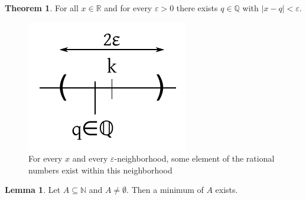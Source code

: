 \documentclass[a4paper,landscape,twocolumn]{article}
\theoremstyle{definition}
\newtheorem{theorem}{Theorem}
\newtheorem{lemma}{Lemma}
\newcommand\abs[1]{\left|#1\right|}
\begin{document}
\begin{theorem}
  \label{QisdenseinR}
  For all $x \in \mathbb R$ and for every $\varepsilon > 0$ there exists $q \in \mathbb Q$
  with $\abs{x - q} < \varepsilon$.

  \begin{figure}[!h]
    \begin{center}
      \includegraphics{img/dense_q.pdf}
      \caption{For every $x$ and every $\varepsilon$-neighborhood, some element of the rational numbers exist within this neighborhood}
    \end{center}
  \end{figure}
\end{theorem}
\begin{lemma}
  Let $A \subseteq \mathbb N$ and $A \neq \emptyset$.
  Then a minimum of $A$ exists.
\end{lemma}
\end{document}

